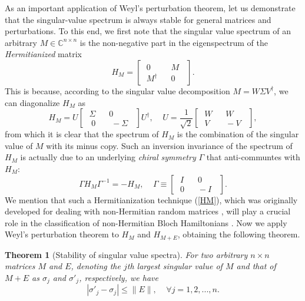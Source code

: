\documentclass{tADP2e}
\theoremstyle{plain}
\theoremstyle{plain}
\newtheorem{theorem}{Theorem}[section]
\theoremstyle{definition}
\begin{document}
As an important application of  Weyl's perturbation theorem, let us demonstrate that the singular-value spectrum is always stable for general matrices and perturbations. To this end, we first note that the singular value spectrum of an arbitrary $M\in\mathbb{C}^{n\times n}$ is the non-negative part in the eigenspectrum of the
\emph{Hermitianized} matrix \cite{JF97}
\begin{equation}
H_M=\begin{bmatrix} \;0\; & \;\;M\;\; \\ \;M^\dag\; & \;\;0\;\; \end{bmatrix}. 
\label{HM}
\end{equation}
This is because, according to the singular value decomposition $M=W\Sigma V^\dag$, we can diagonalize $H_M$ as
\begin{equation}
H_M=U \begin{bmatrix} \;\Sigma\; & \;0\; \\ \;\;0\;\; & \;\;-\Sigma\;\; \end{bmatrix}U^\dag,\;\;\;\; 
U=\frac{1}{\sqrt{2}}\begin{bmatrix} \;W\; & \;\;W\;\; \\ \;V\; & \;\;-V\;\; \end{bmatrix},
\end{equation}
from which it is clear that the spectrum of $H_M$ is the combination of the singular value of $M$ with its minus copy. Such an inversion invariance of the spectrum of  $H_M$ is actually due to an underlying \emph{chiral symmetry} $\Gamma$ that anti-communtes with $H_M$: 
\begin{equation}
\Gamma H_M \Gamma^{-1}=-H_M,\;\;\;\;
\Gamma\equiv\begin{bmatrix} \;I\; & \;\;0\;\; \\ \;0\; & \;\;-I\;\; \end{bmatrix}.
\label{HMchiral}
\end{equation}
We mention that such a Hermitianization technique (\ref{HM}), which was originally developed for dealing with non-Hermitian random matrices \cite{JF97}, will play a crucial role in the classification of non-Hermitian Bloch Hamiltonians \cite{ZG18}. 
Now we apply Weyl's perturbation theorem to $H_M$ and $H_{M+E}$, obtaining the following theorem. 
\begin{theorem}[Stability of singular value spectra]
For two arbitrary $n\times n$ matrices $M$ and $E$, denoting the $j$th largest singular value of $M$ and that of $M+E$ as $\sigma_j$ and $\sigma'_j$, respectively, we have 
\begin{equation}
|\sigma'_j-\sigma_j|\le\|E\|,\;\;\;\;\forall j=1,2,...,n.
\end{equation}
\end{theorem} 
\end{document}
